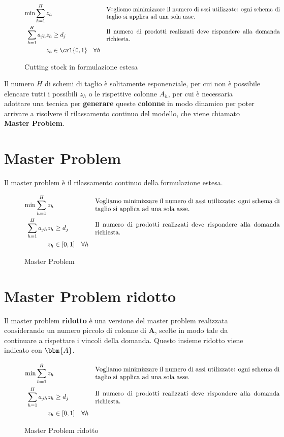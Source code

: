 \documentclass[\main/main.tex]{subfiles}
\begin{document}
\begin{figure}
    \begin{align*}
        \min \sum_{h=1}^H z_h & &&\parbox{10cm}{Vogliamo minimizzare il numero di assi utilizzate: ogni schema di taglio si applica ad una sola asse.}\\
        \sum_{h=1}^H a_{jh} z_h &\geq d_j && \parbox{10cm}{Il numero di prodotti realizzati deve rispondere alla domanda richiesta.}\\
        z_h &\in \crl{0,1} \quad \forall h
    \end{align*}
    \caption{Cutting stock in formulazione estesa}
\end{figure}

Il numero \(H\) di schemi di taglio è solitamente esponenziale, per cui non è possibile elencare tutti i possibili \(z_h\) o le rispettive colonne \(A_h\), per cui è necessaria adottare una tecnica per \textbf{generare} queste \textbf{colonne} in modo dinamico per poter arrivare a risolvere il rilassamento continuo del modello, che viene chiamato \textbf{Master Problem}.

\section{Master Problem}
Il master problem è il rilassamento continuo della formulazione estesa.
\begin{figure}
    \begin{align*}
        \min \sum_{h=1}^H z_h & &&\parbox{10cm}{Vogliamo minimizzare il numero di assi utilizzate: ogni schema di taglio si applica ad una sola asse.}\\
        \sum_{h=1}^H a_{jh} z_h &\geq d_j && \parbox{10cm}{Il numero di prodotti realizzati deve rispondere alla domanda richiesta.}\\
        z_h &\in [0,1] \quad \forall h
    \end{align*}
    \caption{Master Problem}
\end{figure}

\section{Master Problem ridotto}
Il master problem \textbf{ridotto} è una versione del master problem realizzata considerando un numero piccolo di colonne di \(\bm{A}\), scelte in modo tale da continuare a rispettare i vincoli della domanda. Questo insieme ridotto viene indicato con \(\bbm{A}\).

\begin{figure}
    \begin{align*}
        \min \sum_{h=1}^{\bar{H}} z_h & &&\parbox{10cm}{Vogliamo minimizzare il numero di assi utilizzate: ogni schema di taglio si applica ad una sola asse.}\\
        \sum_{h=1}^{\bar{H}} a_{jh} z_h &\geq d_j && \parbox{10cm}{Il numero di prodotti realizzati deve rispondere alla domanda richiesta.}\\
        z_h &\in [0,1] \quad \forall h
    \end{align*}
    \caption{Master Problem ridotto}
\end{figure}
\end{document}
